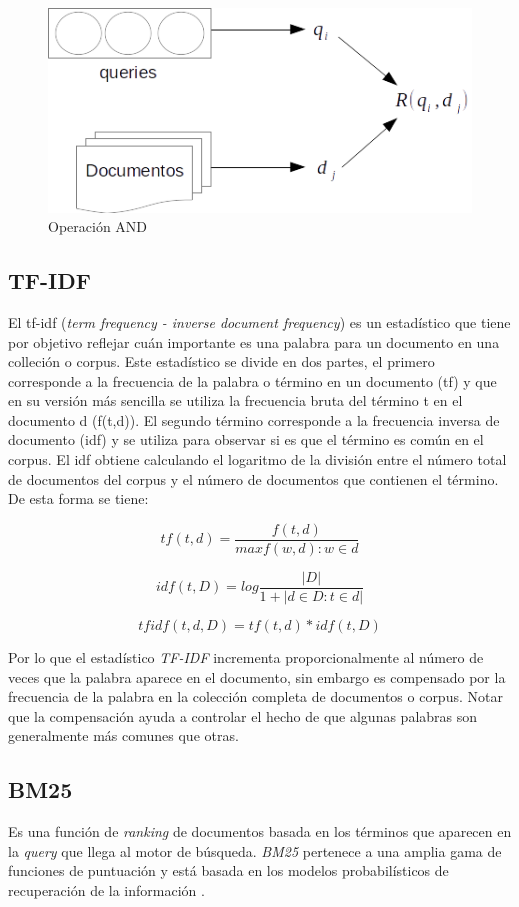 \begin{figure}[tp]
\centering
\includegraphics[scale=.75]{images/ranking_process.png}
\caption{Operaci\'on AND}
\label{fig:ranking_process}
\end{figure}


\subsection{TF-IDF}
\label{marco:tfidf}
El tf-idf (\textit{term frequency - inverse document frequency}) es un estadístico que tiene por objetivo reflejar cuán importante es una palabra para un documento en una colleción o corpus. Este estadístico se divide en dos partes, el primero corresponde a la frecuencia de la palabra o término en un documento (tf) y que en su versión más sencilla se utiliza la frecuencia bruta del término t en el documento d (f(t,d)). El segundo término corresponde a la frecuencia inversa de documento (idf) y se utiliza para observar si es que el término es común en el corpus. El idf obtiene calculando el logaritmo de la división entre el número total de documentos del corpus y el número de documentos que contienen el término.
De esta forma se tiene:

$$tf(t,d) = \dfrac{f(t,d) }{ max{f(w,d) : w \in d}}$$

$$idf(t,D) = log \frac{ |D| }{1 + |{d \in D : t \in d}|} $$

$$ tfidf(t,d,D) = tf(t,d) * idf(t,D) $$

Por lo que el estadístico \textit{TF-IDF} incrementa proporcionalmente al número de veces que la palabra aparece en el documento, sin embargo es compensado por la frecuencia de la palabra en la colección completa de documentos o corpus. Notar que la compensación ayuda a controlar el hecho de que algunas palabras son generalmente más comunes que otras.


\subsection{BM25}
\label{marco:bm25}
Es una función de \textit{ranking} de documentos basada en los términos que aparecen en la \textit{query} que llega al motor de búsqueda. \textit{BM25} pertenece a una amplia gama de funciones de puntuación y está basada en los modelos probabilísticos de recuperación de la información \citep{Baeza-Yates:2011}.

